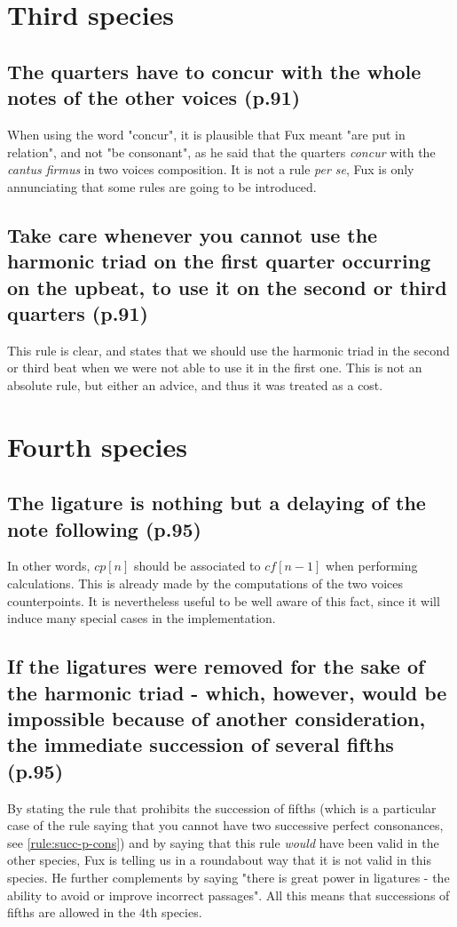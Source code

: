 \section{Third species}
\subsection{The quarters have to concur with the whole notes of the other voices (p.91)}
When using the word "concur", it is plausible that Fux meant "are put in relation", and not "be consonant", as he said that the quarters \textit{concur} with the \textit{cantus firmus} in two voices composition. It is not a rule \textit{per se}, Fux is only annunciating that some rules are going to be introduced.

\subsection{Take care whenever you cannot use the harmonic triad on the first quarter occurring on the upbeat, to use it on the second or third quarters (p.91)}
This rule is clear, and states that we should use the harmonic triad in the second or third beat when we were not able to use it in the first one. This is not an absolute rule, but either an advice, and thus it was treated as a cost.



\section{Fourth species}
\subsection{The ligature is nothing but a delaying of the note following (p.95)}
In other words, $cp[n]$ should be associated to $cf[n-1]$ when performing calculations. This is already made by the computations of the two voices counterpoints. It is nevertheless useful to be well aware of this fact, since it will induce many special cases in the implementation.

\subsection{If the ligatures were removed for the sake of the harmonic triad - which, however, would be impossible because of another consideration, the immediate succession of several fifths (p.95)}
By stating the rule that prohibits the succession of fifths (which is a particular case of the rule saying that you cannot have two successive perfect consonances, see \ref{rule:succ-p-cons}) and by saying that this rule \textit{would} have been valid in the other species, Fux is telling us in a roundabout way that it is not valid in this species. He further complements by saying "there is great power in ligatures - the ability to avoid or improve incorrect passages". All this means that successions of fifths are allowed in the 4th species.

